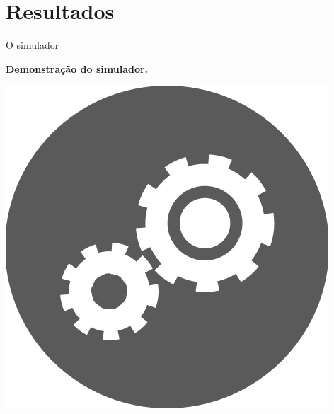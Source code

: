 \section{Resultados}

\begin{frame}{O simulador}

  \begin{center}
  {\huge \textbf{Demonstração do simulador.}}
  \end{center}

  \begin{center}
  \includegraphics[height=\dimexpr5\textheight/14\relax]{figuras/engines}
  \end{center}

\end{frame}

